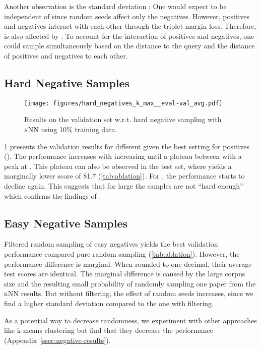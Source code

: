 \documentclass[11pt]{article}
\newcommand{\knn}{\textsc{kNN}\xspace}
\begin{document}
Another observation is the standard deviation : One would expect  to be independent of  since random seeds affect only the negatives.
However, positives and negatives interact with each other through the triplet margin loss.
Therefore,  is also affected by . 
To account for the interaction of positives and negatives, one could sample simultaneously based on the distance to the query and the distance of positives and negatives to each other.


\subsection{Hard Negative Samples} \label{ssec:hard-negatives-results}

\begin{figure}[h]
\centering
\texttt{[image: figures/hard\_negatives\_k\_max\_\_eval-val\_avg.pdf]}
\caption{\label{fig:hard_neg}Results on the validation set w.r.t. hard negative sampling with \knn using 10\% training data.}
\end{figure}

\cref{fig:hard_neg} presents the validation results for different  given the best setting for positives ().
The performance increases with increasing  until a plateau between  with a peak at . 
This plateau can also be observed in the test set, where  yields a marginally lower score of 81.7 (\cref{tab:ablation}).
For , the performance starts to decline again.
This suggests that for large  the samples are not ``hard enough'' which confirms the findings of \citet{Cohan2020}.



\subsection{Easy Negative Samples}

Filtered random sampling of easy negatives yields the best validation performance compared pure random sampling (\cref{tab:ablation}).
However, the performance difference is marginal.
When rounded to one decimal, their average test scores are identical.
The marginal difference is caused by the large corpus size and the resulting small probability of randomly sampling one paper from the \knn results.
But without filtering, the effect of random seeds increases, since we find a higher standard deviation compared to the one with filtering. 

As a potential way to decrease randomness, we experiment with other approaches like k-means clustering but find that they decrease the performance (Appendix~\ref{ssec:negative-results}).
\end{document}
